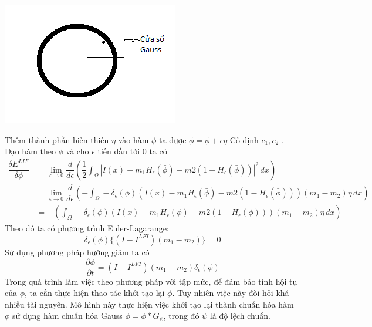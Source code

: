 \documentclass[12pt, oneside, a4]{book}
\begin{document}
\begin{center}
\includegraphics[]{figure/Gaussfilter.png}
\end{center}
Thêm thành phần biến thiên $\eta$ vào hàm $\phi$ ta được $\bar{\phi}=\phi+\epsilon \eta$
Cố định $c_1, c_2$ . Đạo hàm theo $\phi$ và cho $\epsilon$ tiến dần tới 0 ta có
\begin{equation*}
\begin{split}
\dfrac{\delta E^{LIF}}{\delta \phi } &=\lim_{\epsilon \rightarrow 0}\dfrac{d}{d \epsilon}(\dfrac{1}{2}\int_{\Omega}|I(x)-m_1H_{\epsilon}(\bar{\phi})-m2(1-H_{\epsilon}(\bar{\phi}))|^2\,dx) \\ 
&=\lim_{\epsilon \rightarrow 0}\dfrac{d}{d \epsilon}(-\int_{\Omega}-\delta_{\epsilon}(\phi)(I(x)-m_1H_{\epsilon}(\bar{\phi})-m2(1-H_{\epsilon}(\bar{\phi})))(m_1-m_2)\eta\,dx) \\ 
&=-(\int_{\Omega}-\delta_{\epsilon}(\phi)(I(x)-m_1 H_{\epsilon}(\phi)-m2(1-H_{\epsilon}(\phi)))(m_1-m_2)\eta\,dx)
\end{split}
\end{equation*}
Theo đó ta có phương trình Euler-Lagarange:
\begin{equation*}
\delta_{\epsilon}(\phi)\{(I-I^{LFI})(m_1-m_2)\}=0
\end{equation*}
Sử dụng phương pháp hướng giảm ta có
\begin{equation*}
\dfrac{\partial \phi}{\partial t}=(I-I^{LFI})(m_1-m_2)\delta_{\epsilon}(\phi)
\end{equation*}
Trong quá trình làm việc theo phương pháp với tập mức, để đảm bảo tính hội tụ của $\phi$, ta cần thực hiện thao tác khởi tạo lại $\phi$. Tuy nhiên việc này đòi hỏi khá nhiều tài nguyên. Mô hình này thực hiện việc khởi tạo lại thành chuẩn hóa hàm $\phi$ sử dụng hàm chuẩn hóa Gauss $\phi=\phi* G_{\psi}$, trong đó $\psi$ là độ lệch chuẩn.
\end{document}
